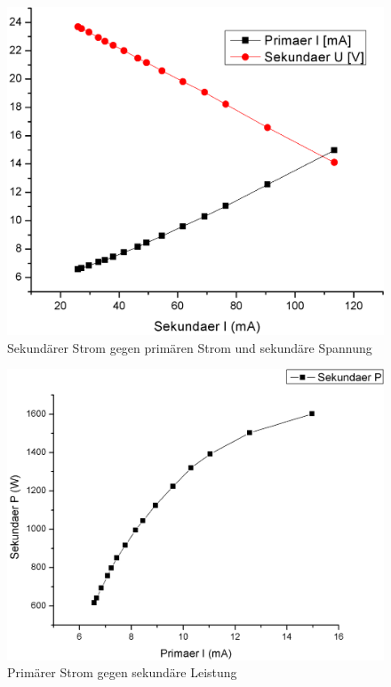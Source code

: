 \documentclass[12pt,a4paper]{article}
\begin{document}
\begin{figure}[H]
	\centering
	\includegraphics[scale=0.40]{./figure/transformator_sI_pI_su.png}
	\caption{Sekundärer Strom gegen primären Strom und sekundäre Spannung}
	\label{fig:trafo_si_pi_su}
\end{figure}
\begin{multicols}{2}

\end{multicols}
\begin{figure}[H]
	\centering
	\includegraphics[scale=0.40]{./figure/transformator_pI_sP.png}
	\caption{Primärer Strom gegen sekundäre Leistung}
	\label{fig:trafo_pi_sp}
\end{figure}
\end{document}
